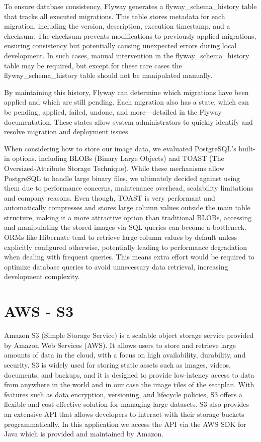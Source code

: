 To ensure database consistency, Flyway generates a flyway\_schema\_history table that tracks all executed migrations. This table stores metadata for each migration, including the version, description, execution timestamp, and a checksum. The checksum prevents modifications to previously applied migrations, ensuring consistency but potentially causing unexpected errors during local development. In such cases, manual intervention in the flyway\_schema\_history table may be required, but except for these rare cases the flyway\_schema\_history table should not be manipulated manually.

By maintaining this history, Flyway can determine which migrations have been applied and which are still pending. Each migration also has a state, which can be pending, applied, failed, undone, and more—detailed in the Flyway documentation. These states allow system administrators to quickly identify and resolve migration and deployment issues.

When considering how to store our image data, we evaluated PostgreSQL’s built-in options, including BLOBs (Binary Large Objects) and TOAST (The Oversized-Attribute Storage Technique). While these mechanisms allow PostgreSQL to handle large binary files, we ultimately decided against using them due to performance concerns, maintenance overhead, scalability limitations and company reasons.
Even though, TOAST is very performant and automatically compresses and stores large column values outside the main table structure, making it a more attractive option than traditional BLOBs, accessing and manipulating the stored images via SQL queries can become a bottleneck. ORMs like Hibernate tend to retrieve large column values by default unless explicitly configured otherwise, potentially leading to performance degradation when dealing with frequent queries. This means extra effort would be required to optimize database queries to avoid unnecessary data retrieval, increasing development complexity.


\section{AWS - S3}
Amazon S3 (Simple Storage Service) is a scalable object storage service provided by Amazon Web Services (AWS). It allows users to store and retrieve large amounts of data in the cloud, with a focus on high availability, durability, and security. S3 is widely used for storing static assets such as images, videos, documents, and backups, and it is designed to provide low-latency access to data from anywhere in the world and in our case the image tiles of the seatplan. With features such as data encryption, versioning, and lifecycle policies, S3 offers a flexible and cost-effective solution for managing large datasets. S3 also provides an extensive API that allows developers to interact with their storage buckets programmatically. In this application we access the API via the AWS SDK for Java which is provided and maintained by Amazon.


